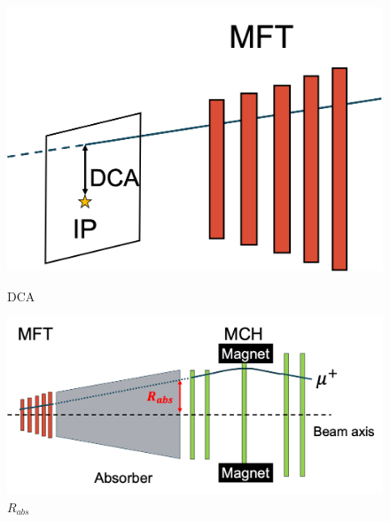         \begin{figure}[htbp]
            \begin{minipage}{0.45\textwidth} %
                \centering
                \includegraphics[keepaspectratio, scale=0.15]{fig/3_3_DCA.png} %
                \caption{DCA}
                \label{Analysis:reco:DCA}
            \end{minipage}
            \hspace{0.5cm}
            \begin{minipage}{0.45\textwidth}
                \centering
                \includegraphics[keepaspectratio, scale=0.15]{fig/3_3_Rabs.png} %
                \caption{$R_{abs}$}
                \label{Analysis:reco:R_abs}
            \end{minipage}
        \end{figure}


